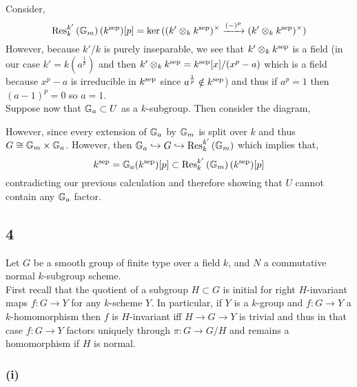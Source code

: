 \documentclass[12pt]{article}
\begin{document}
Consider,
\[ \mathrm{Res}^{k'}_{k} \left( \mathbb{G}_m \right)(k^{\mathrm{sep}})[p] = \ker{((k' \otimes_k k^{\mathrm{sep}})^\times \xrightarrow{(-)^p} (k' \otimes_k k^{\mathrm{sep}})^\times)} \]
However, because $k'/k$ is purely inseparable, we see that $k' \otimes_k k^{\mathrm{sep}}$ is a field (in our case $k' = k(a^{\frac{1}{p}})$ and then $k' \otimes_k k^{\mathrm{sep}} = k^{\mathrm{sep}}[x]/(x^p - a)$ which is a field because $x^p - a$ is irreducible in $k^{\mathrm{sep}}$ since $a^{\frac{1}{p}} \notin k^{\mathrm{sep}}$) and thus if $a^p = 1$ then $(a - 1)^p = 0$ so $a = 1$.
\bigskip\\
Suppose now that $\mathbb{G}_a \subset U$ as a $k$-subgroup. Then consider the diagram,
\begin{center}
\end{center}
However, since every extension of $\mathbb{G}_a$ by $\mathbb{G}_m$ is split over $k$ and thus $G \cong \mathbb{G}_m \times \mathbb{G}_a$. However, then $\mathbb{G}_a \hookrightarrow G \hookrightarrow \mathrm{Res}^{k'}_{k} \left( \mathbb{G}_m \right)$ which implies that,
\[ k^{\mathrm{sep}} = \mathbb{G}_a(k^{\mathrm{sep}})[p] \subset \mathrm{Res}^{k'}_{k} \left( \mathbb{G}_m \right)(k^{\mathrm{sep}})[p] \]
contradicting our previous calculation and therefore showing that $U$ cannot contain any $\mathbb{G}_a$ factor.

\subsection{4}

Let $G$ be a smooth group of finite type over a field $k$, and $N$ a commutative normal $k$-subgroup scheme. 
\bigskip\\
First recall that the quotient of a subgroup $H \subset G$ is initial for right $H$-invariant maps $f : G \to Y$ for any $k$-scheme $Y$. In particular, if $Y$ is a $k$-group and $f : G \to Y$ a $k$-homomorphism then $f$ is $H$-invariant iff $H \to G \to Y$ is trivial and thus in that case $f : G \to Y$ factors uniquely through $\pi : G \to G/H$ and remains a homomorphism if $H$ is normal.

\subsubsection{(i)}
\end{document}
